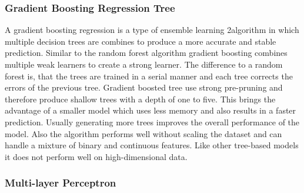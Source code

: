 

\subsubsection{Gradient Boosting Regression Tree}
A gradient boosting regression is a type of ensemble learning 2algorithm in which multiple
decision trees are combines
to produce a more accurate and stable prediction. Similar to the random forest algorithm gradient
boosting combines
multiple weak learners to create a strong learner.
The difference to a random forest is, that the trees are trained in a serial manner and each tree
corrects the errors
of the previous tree. \cite[p. 88-89]{muller_introductionmachinelearning_2016}
Gradient boosted tree use strong pre-pruning and therefore produce shallow trees with a depth of
one to five. This
brings the advantage of a smaller model which uses less memory and also results in a faster
prediction.
Usually generating more trees improves the overall performance of the model. \cite[p.
88-89]{muller_introductionmachinelearning_2016}
Also the algorithm performs well without scaling the dataset and can handle a mixture of binary
and continuous
features. \cite[p. 88-89]{muller_introductionmachinelearning_2016}
Like other tree-based models it does not perform well on high-dimensional data.

\subsubsection{Multi-layer Perceptron}

